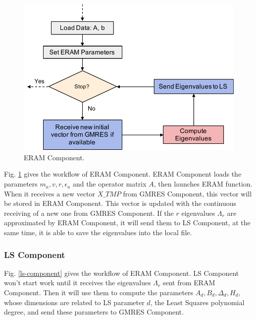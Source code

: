 \begin{figure}[htbp]
	\centering
	\includegraphics[width=4.8in]{fig/ERAM-component.pdf}
	\caption{ERAM Component.}
	\label{eram-component}
\end{figure}

Fig. \ref{eram-component} gives the workflow of ERAM Component. ERAM Component loads the parameters $m_a, v, r, \epsilon_a$ and the operator matrix $A$, then launches ERAM function. When it receives a new vector $X\_TMP$ from GMRES Component, this vector will be stored in ERAM Component. This vector is updated with the continuous receiving of a new one from GMRES Component. If the $r$ eigenvalues $\Lambda_r$ are approximated by ERAM Component, it will send them to LS Component, at the same time, it is able to save the eigenvalues into the local file.

\subsubsection{LS Component}

Fig. \ref{ls-component} gives the workflow of ERAM Component. LS Component won't start work until it receives the eigenvalues $\Lambda_r$ sent from ERAM Component. Then it will use them to compute the parameters $A_d, B_d, \Delta_d, H_d$, whose dimensions are related to LS parameter $d$, the Least Squares polynomial degree, and send these parameters to GMRES Component.

